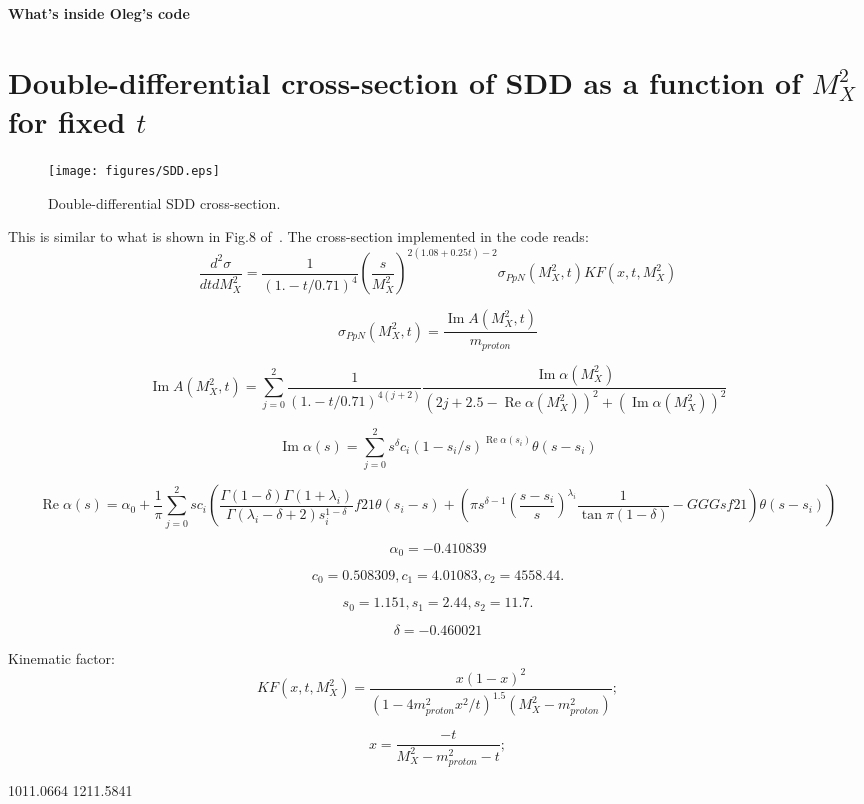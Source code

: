 \documentclass[12pt]{article}
\renewcommand{\Re}{\operatorname{Re}}
\renewcommand{\Im}{\operatorname{Im}}
\begin{document}
\vskip 0.5cm \centerline{\bf\Large What's inside Oleg's code}
\vskip 1cm

\section{Double-differential cross-section of SDD as a function of $M_X^2$ for fixed $t$}
\begin{figure}[!h]
\centering
\texttt{[image: figures/SDD.eps]}
\caption{Double-differential SDD cross-section.}
\label{fig:diagrams}
\end{figure}
This is similar to what is shown in Fig.8 of~\cite{Jenkovszky11}.
The cross-section implemented in the code reads:
$$
\frac{d^2\sigma}{dt dM_X^2}=\frac{1}{(1. - t/0.71)^4} \left(\frac{s}{M_X^2}\right)^{2(1.08 + 0.25t) - 2} \sigma_{PpN}(M_X^2,t) KF(x,t,M_X^2)
$$

$$
\sigma_{PpN}(M_X^2,t)=\frac{\Im A(M_X^2,t)}{m_{proton}}
$$

$$
\Im A(M_X^2,t) = \sum_{j=0}^{2}\frac{1}{(1. - t/0.71)^{4(j+2)}} \frac{\Im\alpha(M_X^2)}{(2 j+2.5-\Re\alpha(M_X^2))^2+(\Im\alpha(M_X^2))^2}
$$

$$
\Im\alpha(s) = \sum_{j=0}^{2} s^\delta c_i (1-s_i/s)^{\Re\alpha(s_i)} \theta(s-s_i) 
$$

$$
\Re\alpha(s) =  \alpha_0 + \frac{1}{\pi} \sum_{j=0}^{2} s c_i (\frac{\Gamma(1-\delta) \Gamma(1+\lambda_i)}{\Gamma(\lambda_i-\delta+2) s_i^{1-\delta}} f21 \theta(s_i-s) + (\pi s^{\delta-1} \left(\frac{s-s_i}{s}\right)^{\lambda_i} \frac{1}{\tan{\pi (1-\delta)}} - GGGsf21) \theta(s-s_i))
$$

$$
\alpha_0=-0.410839
$$

$$
c_0=  0.508309,
c_1 = 4.01083,
c_2 = 4558.44.
$$
  
$$
s_0=  1.151,
s_1 = 2.44,
s_2 = 11.7.
$$

$$
\delta=-0.460021
$$

Kinematic factor:
$$
KF(x,t,M_X^2) = \frac{x (1-x)^2}{\left(1 - 4m_{proton}^2x^2/t\right)^{1.5}(M_X^2-m_{proton}^2)};
$$

$$
x = \frac{-t}{M_X^2 - m_{proton}^2 - t};
$$




\begin{thebibliography}{99}
 1011.0664
 1211.5841
\end{thebibliography}
\end{document}
